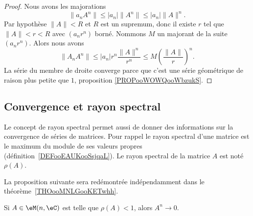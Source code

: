 \begin{proof}
    Nous avons les majorations
    \begin{equation}
        \| a_n A^n\|\leq | a_n |\| A^n \|\leq | a_n |\| A \|^n.
    \end{equation}
    Par hypothèse \( \| A \|<R\) et \( R\) est un supremum, donc il existe \( r\) tel que \( \| A \|<r<R\) avec \( (a_nr^n)\) borné. Nommons \( M\) un majorant de la suite \( (a_nr^n)\). Alors nous avons
    \begin{equation}
        \| A_nA^n \|\leq | a_n |r^n\frac{ \| A \|^n }{ r^n }\leq M\left( \frac{ \| A \| }{ r } \right)^n.
    \end{equation}
    La série du membre de droite converge parce que c'est une série géométrique de raison plus petite que \( 1\), proposition \ref{PROPooWOWQooWbzukS}.
\end{proof}

\subsection{Convergence et rayon spectral}

Le concept de rayon spectral permet aussi de donner des informations sur la convergence de séries de matrices. Pour rappel le rayon spectral d'une matrice est le maximum du module de ses valeurs propres (définition~\ref{DEFooEAUKooSsjqaL}). Le rayon spectral de la matrice \( A\) est noté \( \rho(A)\).

La proposition suivante sera redémontrée indépendamment dans le théorème~\ref{THOooMNLGooKETwhh}.

\begin{proposition}      \label{PROPooDJFLooBqqEPT}
    Si \( A\in \eM(n,\eC)\) est telle que \( \rho(A)<1\), alors \( A^n\to 0\).
\end{proposition}

